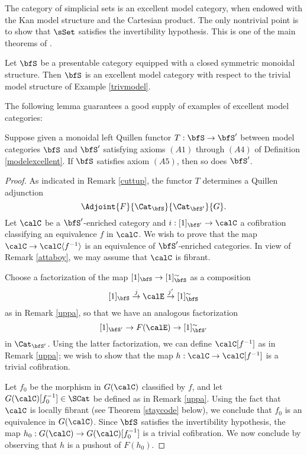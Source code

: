 \begin{example}\label{cuppata}
The category of simplicial sets is an excellent model category, when endowed with the Kan model structure and the Cartesian product. The only nontrivial point is to show that $\sSet$ satisfies the invertibility hypothesis. This is one of the main theorems of \cite{dwyerkan}.
\end{example}

\begin{example}
Let $\bfS$ be a presentable category equipped with a closed symmetric monoidal structure.
Then $\bfS$ is an excellent model category with respect to the trivial model structure
of Example \ref{trivmodel}.
\end{example}

The following lemma guarantees a good supply of examples of excellent model categories:

\begin{lemma}\label{cuppat}
Suppose given a monoidal left Quillen functor $T: \bfS \rightarrow \bfS'$
between model categories $\bfS$ and $\bfS'$ satisfying axioms
$(A1)$ through $(A4)$ of Definition \ref{modelexcellent}.
If $\bfS$ satisfies axiom $(A5)$, then so does $\bfS'$.
\end{lemma}

\begin{proof}
As indicated in Remark \ref{cuttup}, the functor $T$ determines a Quillen adjunction
$$ \Adjoint{F}{\Cat_{\bfS}}{\Cat_{\bfS'}}{G}.$$
Let $\calC$ be a $\bfS'$-enriched category and $i: [1]_{\bfS'} \rightarrow \calC$
a cofibration classifying an equivalence $f$ in $\calC$. We wish to prove that the
map $\calC \rightarrow \calC \langle f^{-1} \rangle$ is an equivalence of
$\bfS'$-enriched categories. In view of Remark \ref{attaboy}, we may assume
that $\calC$ is fibrant.

Choose a factorization of the map $[1]_{\bfS} \rightarrow [1]_{\bfS}^{\sim}$
as a composition
$$ [1]_{\bfS} \stackrel{j}{\rightarrow} \calE \stackrel{j'}{\rightarrow} [1]_{\bfS}^{\sim}$$
as in Remark \ref{uppa}, so that we have an analogous factorization
$$ [1]_{\bfS'} \rightarrow F(\calE) \rightarrow [1]_{\bfS'}^{\sim}$$
in $\Cat_{\bfS'}$. Using the latter factorization, we can define
$\calC[ f^{-1}]$ as in Remark \ref{uppa}; we wish to show that the map
$h: \calC \rightarrow \calC[f^{-1}]$ is a trivial cofibration. 

Let $f_0$ be the morphism in $G(\calC)$ classified by $f$, and
let $G(\calC)[f_0^{-1}] \in \SCat$ be defined as in Remark \ref{uppa}. 
Using the fact that $\calC$ is locally fibrant (see Theorem \ref{staycode} below),
we conclude that $f_0$ is an equivalence in $G(\calC)$. Since $\bfS$
satisfies the invertibility hypothesis, the map
$h_0: G(\calC) \rightarrow G(\calC)[f_0^{-1}]$ is a trivial cofibration.
We now conclude by observing that $h$ is a pushout of $F(h_0)$.
\end{proof}

